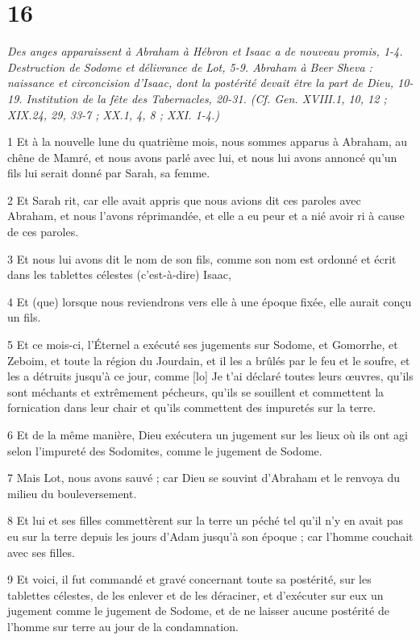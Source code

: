 \chapter{16}

\par \textit{Des anges apparaissent à Abraham à Hébron et Isaac a de nouveau promis, 1-4. Destruction de Sodome et délivrance de Lot, 5-9. Abraham à Beer Sheva : naissance et circoncision d'Isaac, dont la postérité devait être la part de Dieu, 10-19. Institution de la fête des Tabernacles, 20-31. (Cf. Gen. XVIII.1, 10, 12 ; XIX.24, 29, 33-7 ; XX.1, 4, 8 ; XXI. 1-4.)}

\par 1 Et à la nouvelle lune du quatrième mois, nous sommes apparus à Abraham, au chêne de Mamré, et nous avons parlé avec lui, et nous lui avons annoncé qu'un fils lui serait donné par Sarah, sa femme.
\par 2 Et Sarah rit, car elle avait appris que nous avions dit ces paroles avec Abraham, et nous l'avons réprimandée, et elle a eu peur et a nié avoir ri à cause de ces paroles.
\par 3 Et nous lui avons dit le nom de son fils, comme son nom est ordonné et écrit dans les tablettes célestes (c'est-à-dire) Isaac,
\par 4 Et (que) lorsque nous reviendrons vers elle à une époque fixée, elle aurait conçu un fils.
\par 5 Et ce mois-ci, l'Éternel a exécuté ses jugements sur Sodome, et Gomorrhe, et Zeboim, et toute la région du Jourdain, et il les a brûlés par le feu et le soufre, et les a détruits jusqu'à ce jour, comme [lo] Je t'ai déclaré toutes leurs œuvres, qu'ils sont méchants et extrêmement pécheurs, qu'ils se souillent et commettent la fornication dans leur chair et qu'ils commettent des impuretés sur la terre.
\par 6 Et de la même manière, Dieu exécutera un jugement sur les lieux où ils ont agi selon l'impureté des Sodomites, comme le jugement de Sodome.
\par 7 Mais Lot, nous avons sauvé ; car Dieu se souvint d'Abraham et le renvoya du milieu du bouleversement.
\par 8 Et lui et ses filles commettèrent sur la terre un péché tel qu'il n'y en avait pas eu sur la terre depuis les jours d'Adam jusqu'à son époque ; car l'homme couchait avec ses filles.
\par 9 Et voici, il fut commandé et gravé concernant toute sa postérité, sur les tablettes célestes, de les enlever et de les déraciner, et d'exécuter sur eux un jugement comme le jugement de Sodome, et de ne laisser aucune postérité de l'homme sur terre au jour de la condamnation.
